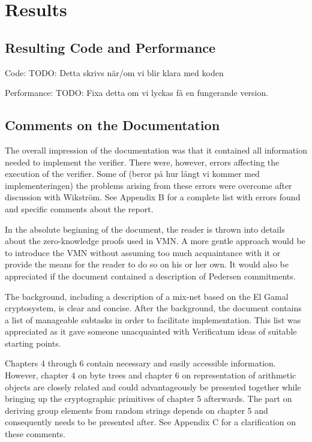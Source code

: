 \section{Results}

\subsection{Resulting Code and Performance}

Code:
TODO: Detta skrivs när/om vi blir klara med koden

Performance:
TODO: Fixa detta om vi lyckas få en fungerande version.

\subsection{Comments on the Documentation}

The overall impression of the documentation was that it contained all
information needed to implement the verifier. There were, however,
errors affecting the execution of the verifier. Some of (beror på hur
långt vi kommer med implementeringen) the problems arising from these
errors were overcome after discussion with Wikström. See Appendix B
for a complete list with errors found and specific comments about the
report.

In the absolute beginning of the document, the reader is thrown into
details about the zero-knowledge proofs used in VMN. A more gentle
approach would be to introduce the VMN without assuming too much
acquaintance with it or provide the means for the reader to do so on
his or her own. It would also be appreciated if the document contained
a description of Pedersen commitments.

The background, including a description of a mix-net based on the El
Gamal cryptosystem, is clear and concise. After the background, the
document contains a list of manageable subtasks in order to facilitate
implementation. This list was appreciated as it gave someone
unacquainted with Verificatum ideas of suitable starting points.

Chapters 4 through 6 contain necessary and easily accessible
information. However, chapter 4 on byte trees and chapter 6 on
representation of arithmetic objects are closely related and could
advantageously be presented together while bringing up the
cryptographic primitives of chapter 5 afterwards. The part on deriving
group elements from random strings depends on chapter 5 and
consequently needs to be presented after. See Appendix C for a
clarification on these comments.

